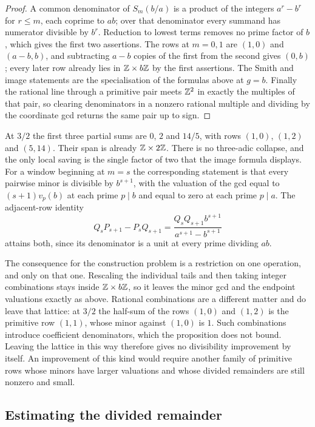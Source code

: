 \documentclass[11pt]{article}
\begin{document}
\begin{proof}
A common denominator of $S_m(b/a)$ is a product of the integers $a^r-b^r$ for
$r\le m$, each coprime to $ab$; over that denominator every summand has
numerator divisible by $b^r$. Reduction to lowest terms removes no prime factor
of $b$, which gives the first two assertions. The rows at $m=0,1$ are $(1,0)$
and $(a-b,b)$, and subtracting $a-b$ copies of the first from the second gives
$(0,b)$; every later row already lies in $\mathbb{Z}\times b\mathbb{Z}$ by the first
assertions. The Smith and image statements are the specialisation of the
formulas above at $g=b$. Finally the rational line through a primitive pair
meets $\mathbb{Z}^2$ in exactly the multiples of that pair, so clearing denominators in
a nonzero rational multiple and dividing by the coordinate gcd returns the same
pair up to sign.
\end{proof}

At $3/2$ the first three partial sums are $0$, $2$ and $14/5$, with rows
$(1,0)$, $(1,2)$ and $(5,14)$. Their span is already $\mathbb{Z}\times2\mathbb{Z}$. There is no
three-adic collapse, and the only local saving is the single factor of two that
the image formula displays. For a window beginning at $m=s$ the corresponding
statement is that every pairwise minor is divisible by $b^{s+1}$, with the
valuation of the gcd equal to $(s+1)v_p(b)$ at each prime $p\mid b$ and equal
to zero at each prime $p\mid a$. The adjacent-row identity
\[
 Q_sP_{s+1}-P_sQ_{s+1}
 =\frac{Q_sQ_{s+1}b^{s+1}}{a^{s+1}-b^{s+1}}
\]
attains both, since its denominator is a unit at every prime dividing $ab$.

The consequence for the construction problem is a restriction on one
operation, and only on that one. Rescaling the individual tails and then taking
integer combinations stays inside $\mathbb{Z}\times b\mathbb{Z}$, so it leaves the minor gcd
and the endpoint valuations exactly as above. Rational combinations are a
different matter and do leave that lattice: at $3/2$ the half-sum of the rows
$(1,0)$ and $(1,2)$ is the primitive row $(1,1)$, whose minor against $(1,0)$
is $1$. Such combinations introduce coefficient denominators, which
the proposition does not bound. Leaving the lattice in this way therefore
gives no divisibility improvement by itself. An improvement of this kind
would require another family of primitive rows whose minors have larger
valuations and whose divided remainders are still nonzero and small.



\subsection{Estimating the divided remainder}
\end{document}
